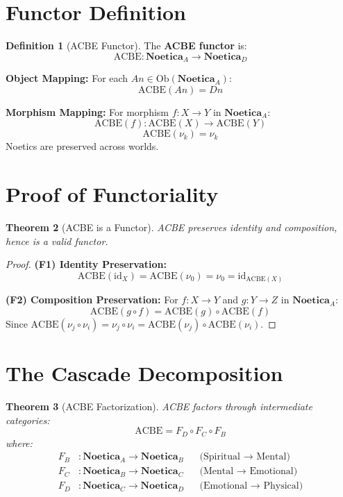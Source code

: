 \documentclass[11pt,twoside,openright]{book}
\theoremstyle{definition}
\newtheorem{definition}{Definition}[chapter]
\theoremstyle{plain}
\newtheorem{theorem}[definition]{Theorem}
\theoremstyle{remark}
\newcommand{\Noetica}{\mathbf{Noetica}}
\newcommand{\noe}[1]{\nu_{#1}}
\newcommand{\Ob}{\mathrm{Ob}}
\newcommand{\id}{\mathrm{id}}
\begin{document}
\section{Functor Definition}

\begin{definition}[ACBE Functor]
\label{def:acbe-functor}
The \textbf{ACBE functor} is:
\[
\mathrm{ACBE} : \Noetica_A \to \Noetica_D
\]

\textbf{Object Mapping:}
For each $An \in \Ob(\Noetica_A)$:
\[
\mathrm{ACBE}(An) = Dn
\]

\textbf{Morphism Mapping:}
For morphism $f : X \to Y$ in $\Noetica_A$:
\[
\mathrm{ACBE}(f) : \mathrm{ACBE}(X) \to \mathrm{ACBE}(Y)
\]
\[
\mathrm{ACBE}(\noe{k}) = \noe{k}
\]
Noetics are preserved across worlds.
\end{definition}

\section{Proof of Functoriality}

\begin{theorem}[ACBE is a Functor]
\label{thm:acbe-functor}
ACBE preserves identity and composition, hence is a valid functor.
\end{theorem}

\begin{proof}
\textbf{(F1) Identity Preservation:}
\[
\mathrm{ACBE}(\id_X) = \mathrm{ACBE}(\noe{0}) = \noe{0} = \id_{\mathrm{ACBE}(X)}
\]

\textbf{(F2) Composition Preservation:}
For $f : X \to Y$ and $g : Y \to Z$ in $\Noetica_A$:
\[
\mathrm{ACBE}(g \circ f) = \mathrm{ACBE}(g) \circ \mathrm{ACBE}(f)
\]
Since $\mathrm{ACBE}(\noe{j} \circ \noe{i}) = \noe{j} \circ \noe{i} = \mathrm{ACBE}(\noe{j}) \circ \mathrm{ACBE}(\noe{i})$.
\end{proof}

\section{The Cascade Decomposition}

\begin{theorem}[ACBE Factorization]
\label{thm:acbe-factor}
ACBE factors through intermediate categories:
\[
\mathrm{ACBE} = F_D \circ F_C \circ F_B
\]
where:
\begin{align}
F_B &: \Noetica_A \to \Noetica_B && \text{(Spiritual } \to \text{ Mental)} \\
F_C &: \Noetica_B \to \Noetica_C && \text{(Mental } \to \text{ Emotional)} \\
F_D &: \Noetica_C \to \Noetica_D && \text{(Emotional } \to \text{ Physical)}
\end{align}
\end{theorem}
\end{document}

